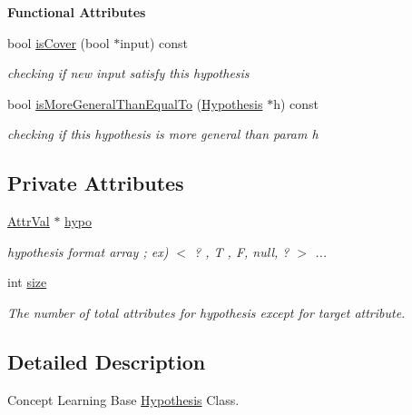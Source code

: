 \begin{Indent}{\bf Functional Attributes}\par
\begin{DoxyCompactItemize}
\item 
bool \hyperlink{class_hypothesis_a38c5f393775c1dd9eada90c7e5f163e0}{is\-Cover} (bool $\ast$input) const 
\begin{DoxyCompactList}\small\item\em checking if new input satisfy this hypothesis \end{DoxyCompactList}\item 
bool \hyperlink{class_hypothesis_ad0d80b24404c0398ef502740b5115f4a}{is\-More\-General\-Than\-Equal\-To} (\hyperlink{class_hypothesis}{Hypothesis} $\ast$h) const 
\begin{DoxyCompactList}\small\item\em checking if this hypothesis is more general than param h \end{DoxyCompactList}\end{DoxyCompactItemize}
\end{Indent}
\subsection*{Private Attributes}
\begin{DoxyCompactItemize}
\item 
\hyperlink{concept_8h_a9680d29b8d997e4adbf99481b65e897d}{Attr\-Val} $\ast$ \hyperlink{class_hypothesis_a01481da71fa839150188db4720b02439}{hypo}
\begin{DoxyCompactList}\small\item\em hypothesis format array ; ex) $<$ ? , T , F, null, ? $>$ ... \end{DoxyCompactList}\item 
int \hyperlink{class_hypothesis_a2fda5511fef4765414c3229ea6780e1e}{size}
\begin{DoxyCompactList}\small\item\em The number of total attributes for hypothesis except for target attribute. \end{DoxyCompactList}\end{DoxyCompactItemize}


\subsection{Detailed Description}
Concept Learning Base \hyperlink{class_hypothesis}{Hypothesis} Class. 

